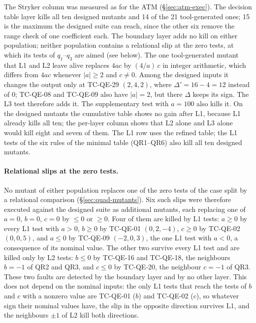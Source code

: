 \documentclass[11pt,a4paper]{article}
\begin{document}
The Stryker column was measured as for the ATM (\S\ref{sec:atm-exec}). The
decision table layer kills all ten designed mutants and 14 of the 21
tool-generated ones; 15 is the maximum the designed suite can reach, since
the other six remove the range check of one coefficient each. The boundary
layer adds no kill on either population; neither population contains a relational slip at the zero tests, at which its tests of \(q_1\)--\(q_3\) are aimed (see below). The one tool-generated mutant that
L1 and L2 leave alive replaces \(4ac\) by \((4/a)\,c\) in integer arithmetic, which differs from \(4ac\) whenever \(|a|\ge2\) and \(c\ne0\). Among the designed inputs it changes the output only at TC-QE-29 \((2,4,2)\), where \(\Delta'=16-4=12\) instead of \(0\); TC-QE-08 and TC-QE-09 also have \(|a|=2\), but there \(\Delta\) keeps its sign. The L3 test therefore adds it. The
supplementary test with \(a=100\) also kills it. On the designed mutants the
cumulative table shows no gain after L1, because L1 already kills all ten;
the per-layer column shows that L2 alone and L3 alone would kill eight and
seven of them.
The L1 row uses the refined table; the L1 tests of the six rules of the
minimal table (QR1--QR6) also kill all ten designed mutants.

\paragraph{Relational slips at the zero tests.} No mutant of either
population replaces one of the zero tests of the case split by a relational
comparison (\S\ref{sec:quad-mutants}). Six such slips were therefore
executed against the designed suite as additional mutants, each replacing
one of \(a=0\), \(b=0\), \(c=0\) by \(\le0\) or \(\ge0\). Four of them are
killed by L1 tests: \(a\ge0\) by every L1 test with \(a>0\), \(b\ge0\) by
TC-QE-01 \((0,2,-4)\), \(c\ge0\) by TC-QE-02 \((0,0,5)\), and \(a\le0\) by
TC-QE-09 \((-2,0,3)\), the one L1 test with \(a<0\), a consequence of its nominal value. The other two survive
every L1 test and are killed only by L2 tests: \(b\le0\) by TC-QE-16 and
TC-QE-18, the neighbours \(b=-1\) of QR2 and QR3, and \(c\le0\) by TC-QE-20,
the neighbour \(c=-1\) of QR3. These two faults are detected by the boundary
layer and by no other layer. This does not depend on the nominal inputs: the only L1 tests that reach the tests of \(b\) and \(c\) with a nonzero value are TC-QE-01 (\(b\)) and TC-QE-02 (\(c\)), so whatever sign their nominal values have, the slip in the opposite direction survives L1, and the neighbours \(\pm1\) of L2 kill both directions.
\end{document}
